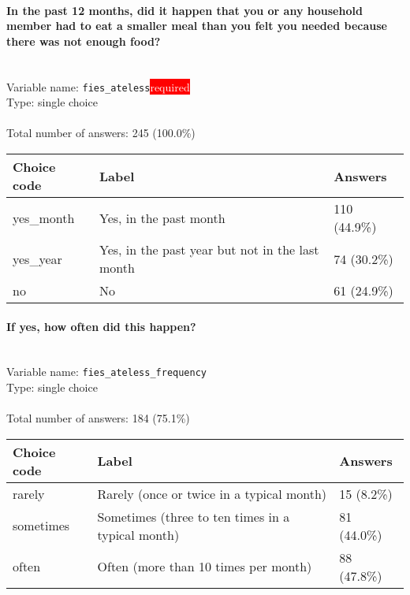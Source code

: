 \documentclass[11.5pt, a4paper]{scrartcl}
\begin{document}
\paragraph{In the past 12 months, did it happen that you or any household member had to eat a smaller meal than you felt you needed because there was not enough food? }
\  \\Variable name: \texttt{fies\_ateless}\hfill\colorbox{red}{\small{\textcolor{white}{required}}}\\
 Type: single choice\\
\\Total number of answers: 245 (100.0\%)
\\[0.2em] \begin{tabular}{p{4cm}|p{8cm}|p{3cm}}
Choice code & Label & Answers \\
\hline
yes\_month & Yes, in the past month& \cellcolor{color2}110 (44.9\%)\\
\cellcolor{mygray} yes\_year & \cellcolor{mygray}Yes, in the past year but not in the last month & \cellcolor{color1}74 (30.2\%)\\
no & No& \cellcolor{color1}61 (24.9\%)\\
\end{tabular}
\paragraph{If yes, how often did this happen? }
\  \\Variable name: \texttt{fies\_ateless\_frequency}\\
Type: single choice\\
\\Total number of answers: 184 (75.1\%)
\\[0.2em] \begin{tabular}{p{4cm}|p{8cm}|p{3cm}}
Choice code & Label & Answers \\
\hline
rarely & Rarely (once or twice in a typical month)& \cellcolor{color0}15 (8.2\%)\\
\cellcolor{mygray} sometimes & \cellcolor{mygray}Sometimes (three to ten times in a typical month) & \cellcolor{color2}81 (44.0\%)\\
often & Often (more than 10 times per month)& \cellcolor{color2}88 (47.8\%)\\
\end{tabular}
\end{document}
